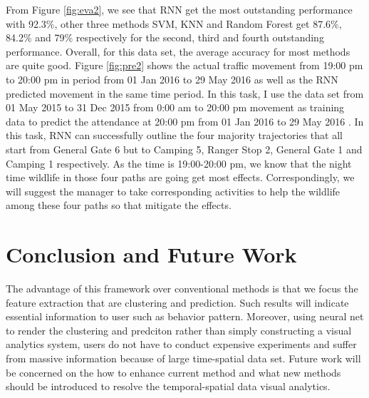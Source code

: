 \documentclass[runningheads,a4paper]{llncs}
\begin{document}
From Figure \ref{fig:eva2}, we see that RNN get the most outstanding performance with 92.3\%, other three methods SVM, KNN and Random Forest get 87.6\%, 84.2\% and 79\% respectively for the second, third and fourth outstanding performance. Overall, for this data set, the average accuracy for most methods are quite good. Figure \ref{fig:pre2} shows the actual traffic movement from 19:00 pm to 20:00 pm in period from 01 Jan 2016 to 29 May 2016 as well as the RNN predicted movement in the same time period.  In this task, I use the data set from 01 May 2015 to 31 Dec 2015 from 0:00 am to 20:00 pm movement as training data to predict the attendance at 20:00 pm from 01 Jan 2016 to 29 May 2016 . In this task, RNN can successfully outline the four majority trajectories that all start from General Gate 6 but to Camping 5, Ranger Stop 2, General Gate 1 and Camping 1 respectively. As the time is 19:00-20:00 pm, we know that the night time wildlife in those four paths are going get most effects. Correspondingly, we will suggest the manager to take corresponding activities to help the wildlife among these four paths so that mitigate the effects.

\section{Conclusion and Future Work}
The advantage of this framework over conventional methods is that we focus the feature extraction that are clustering and prediction. Such results will indicate essential information to user such as behavior pattern. Moreover, using neural net to render the clustering and predciton rather than simply constructing a visual analytics system, users do not have to conduct expensive experiments and suffer from massive information because of large time-spatial data set. Future work will be concerned on the how to enhance current method and what new methods should be introduced to resolve the temporal-spatial data visual analytics.

%
%
% 
% 
\end{document}
